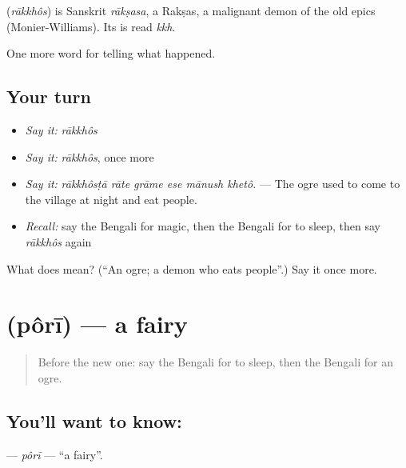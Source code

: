 \begin{cousinweb}
\textbf{} (\emph{rākkhôs}) is Sanskrit \emph{rākṣasa}, a Rakṣas, a malignant demon of the old epics (Monier-Williams). Its  is read \emph{kkh}.
\end{cousinweb}

\begin{grammarlens}[title={What you've built}]
One more word for telling what happened.
\end{grammarlens}

\subsection*{Your turn}
\begin{itemize}
\raggedright
  \item \emph{Say it:} \emph{rākkhôs}
  \item \emph{Say it:} \emph{rākkhôs}, once more
  \item \emph{Say it:} \emph{rākkhôsṭā rāte grāme ese mānush khetô.} — The ogre used to come to the village at night and eat people.
  \item \emph{Recall:} say the Bengali for magic, then the Bengali for to sleep, then say \emph{rākkhôs} again
\end{itemize}

\begin{tcolorbox}[breakable,colback=teal!4,colframe=teal!35!black,title={Before you move on}]
What does  mean? (\textquotedblleft{}An ogre; a demon who eats people\textquotedblright{}.) Say it once more.
\end{tcolorbox}
\section[\texorpdfstring{\bn{পরী} (pôrī)}{পরী (pôrī)}]{ (pôrī) — a fairy}

\label{lesson:BN-C322-pori}



\begin{quote}
Before the new one: say the Bengali for to sleep, then the Bengali for an ogre.
\end{quote}

\subsection*{You'll want to know: }
\textbf{} — \emph{pôrī} — \textquotedblleft{}a fairy\textquotedblright{}.

